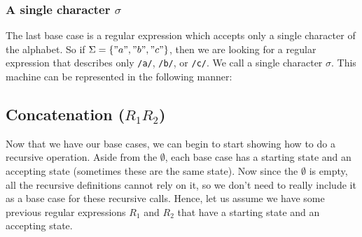\documentclass[main.tex]{subfiles}
\begin{document}
\subsubsection{A single character $\sigma$}
The last base case is a regular expression which accepts only a single character of the alphabet. So if $\Sigma = \{"a","b","c"\}$, then we are looking for a regular expression that describes only \texttt{/a/}, \texttt{/b/}, or \texttt{/c/}. We call a single character $\sigma$. This machine can be represented in the following manner:  
\begin{center}
\end{center}

\subsection{Concatenation ($R_1R_2$)}

Now that we have our base cases, we can begin to start showing how to do a recursive operation.
Aside from the $\emptyset$, each base case has a starting state and an accepting state (sometimes these are the same state). Now since the $\emptyset$ is empty, all the recursive definitions cannot rely on it, so we don't need to really include it as a base case for these recursive calls. Hence, let us assume we have some previous regular expressions $R_1$ and $R_2$ that have a starting state and an accepting state.
\begin{center}
\end{center}
\end{document}
